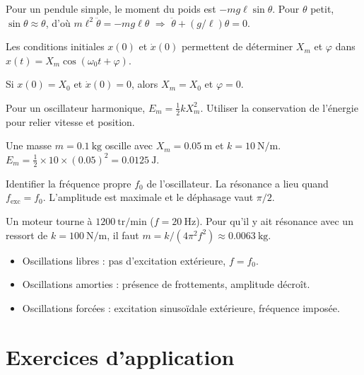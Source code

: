 \begin{exemple}
Pour un pendule simple, le moment du poids est $-mg\ell\sin\theta$. Pour $\theta$ petit, $\sin\theta \approx \theta$, d'où $m\ell^2\ddot{\theta} = -mg\ell\theta$ $\Rightarrow$ $\ddot{\theta} + (g/\ell)\theta = 0$.
\end{exemple}

Les conditions initiales $x(0)$ et $\dot{x}(0)$ permettent de déterminer $X_m$ et $\varphi$ dans $x(t) = X_m\cos(\omega_0 t + \varphi)$.

\begin{exemple}
Si $x(0) = X_0$ et $\dot{x}(0) = 0$, alors $X_m = X_0$ et $\varphi = 0$.
\end{exemple}

Pour un oscillateur harmonique, $E_m = \frac{1}{2}k X_m^2$. Utiliser la conservation de l'énergie pour relier vitesse et position.

\begin{exemple}
Une masse $m = \SI{0.1}{\kilogram}$ oscille avec $X_m = \SI{0.05}{\metre}$ et $k = \SI{10}{\newton\per\metre}$. $E_m = \frac{1}{2} \times 10 \times (0.05)^2 = \SI{0.0125}{\joule}$.
\end{exemple}

Identifier la fréquence propre $f_0$ de l'oscillateur. La résonance a lieu quand $f_{\text{exc}} = f_0$. L'amplitude est maximale et le déphasage vaut $\pi/2$.

\begin{exemple}
Un moteur tourne à $\num{1200}~\mathrm{tr/min}$ ($f = \SI{20}{\hertz}$). Pour qu'il y ait résonance avec un ressort de $k = \SI{100}{\newton\per\metre}$, il faut $m = k/(4\pi^2 f^2) \approx \SI{0.0063}{\kilogram}$.
\end{exemple}

\begin{itemize}
    \item Oscillations libres : pas d'excitation extérieure, $f = f_0$.
    \item Oscillations amorties : présence de frottements, amplitude décroît.
    \item Oscillations forcées : excitation sinusoïdale extérieure, fréquence imposée.
\end{itemize}

\section{Exercices d'application}

